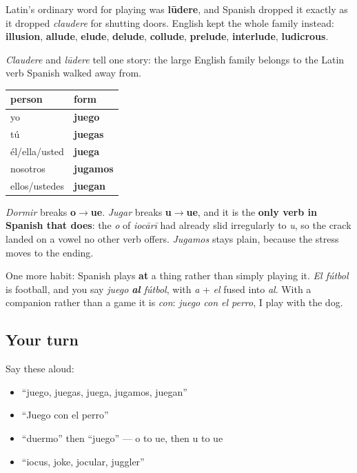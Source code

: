 \begin{culture}
Latin's ordinary word for playing was \textbf{lūdere}, and Spanish dropped it exactly as it dropped \emph{claudere} for shutting doors. English kept the whole family instead: \textbf{illusion}, \textbf{allude}, \textbf{elude}, \textbf{delude}, \textbf{collude}, \textbf{prelude}, \textbf{interlude}, \textbf{ludicrous}.

\emph{Claudere} and \emph{lūdere} tell one story: the large English family belongs to the Latin verb Spanish walked away from.
\end{culture}

\begin{grammarlens}[title={Grammar Lens: the fourth crack, with one member}]
\noindent
\begin{tabularx}{\linewidth}{@{}>{\raggedright\arraybackslash}X>{\raggedright\arraybackslash}X@{}}
\toprule
\textbf{person} & \textbf{form} \\
\midrule
yo & \textbf{juego} \\
tú & \textbf{juegas} \\
él/ella/usted & \textbf{juega} \\
nosotros & \textbf{jugamos} \\
ellos/ustedes & \textbf{juegan} \\
\bottomrule
\end{tabularx}

\emph{Dormir} breaks \textbf{o$\to$ue}. \emph{Jugar} breaks \textbf{u$\to$ue}, and it is the \textbf{only verb in Spanish that does}: the \emph{o} of \emph{iocārī} had already slid irregularly to \emph{u}, so the crack landed on a vowel no other verb offers. \emph{Jugamos} stays plain, because the stress moves to the ending.

One more habit: Spanish plays \textbf{at} a thing rather than simply playing it. \emph{El fútbol} is football, and you say \emph{juego \textbf{al} fútbol}, with \emph{a} + \emph{el} fused into \emph{al}. With a companion rather than a game it is \emph{con}: \emph{juego con el perro}, I play with the dog.
\end{grammarlens}

\subsection*{Your turn}
Say these aloud:

\begin{itemize}
\raggedright
  \item \textquotedblleft{}juego, juegas, juega, jugamos, juegan\textquotedblright{}
  \item \textquotedblleft{}Juego con el perro\textquotedblright{}
  \item \textquotedblleft{}duermo\textquotedblright{} then \textquotedblleft{}juego\textquotedblright{} — o to ue, then u to ue
  \item \textquotedblleft{}iocus, joke, jocular, juggler\textquotedblright{}
\end{itemize}

